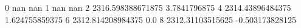 0 nan nan
1 nan nan
2 2316.598388671875 3.7841796875
4 2314.43896484375 1.624755859375
6 2312.814208984375 0.0
8 2312.31103515625 -0.503173828125
